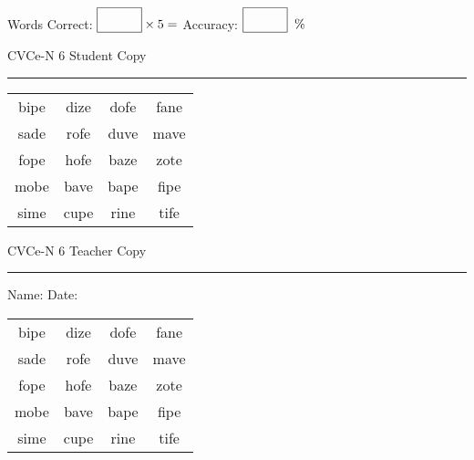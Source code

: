 \documentclass{memoir}
\begin{document}
\small

Words Correct: $\fbox{\phantom{\huge 100}} \times 5 = $ Accuracy: $\fbox{\phantom{\huge 100}}\;\; \%$ 

\vfill

\newpage


\footnotesize \noindent
CVCe-N 6 \hfill Student Copy
\smallskip
\hrule

\Large

\setlength{\tabcolsep}{14pt}
\def\arraystretch{2}

{\selectfont


\begin{vplace}[0.5]
\begin{center}
\begin{tabular}{cccc}
bipe & dize & dofe & fane \\
sade & rofe & duve & mave \\
fope & hofe & baze & zote \\
mobe & bave & bape & fipe \\
sime & cupe & rine & tife \\
\end{tabular}
\end{center}
\end{vplace}

}

\newpage

\footnotesize \noindent
CVCe-N 6 \hfill Teacher Copy
\smallskip
\hrule

\small

\vfill

\noindent
Name: \underline{\hspace{1.75in}} \hfill Date: \underline{\hspace{1in}}

\Large

{\selectfont


\begin{vplace}[0.5]
\begin{center}
\begin{tabular}{cccc}
bipe & dize & dofe & fane \\
sade & rofe & duve & mave \\
fope & hofe & baze & zote \\
mobe & bave & bape & fipe \\
sime & cupe & rine & tife \\
\end{tabular}
\end{center}
\end{vplace}



}
\end{document}
